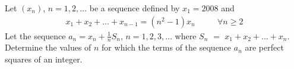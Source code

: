 Let $(x_n)$, $n=1,2, \ldots $ be a sequence defined by $x_1=2008$ and
\begin{align*} x_1 +x_2 + \ldots + x_{n-1} = \left( n^2-1 \right) x_n \qquad ~ ~ ~ \forall n \geq 2 \end{align*}Let the sequence $a_n=x_n + \frac{1}{n} S_n$, $n=1,2,3, \ldots $ where $S_n$ $=$ $x_1+x_2 +\ldots +x_n$. Determine the values of $n$ for which the terms of the sequence $a_n$ are perfect squares of an integer.